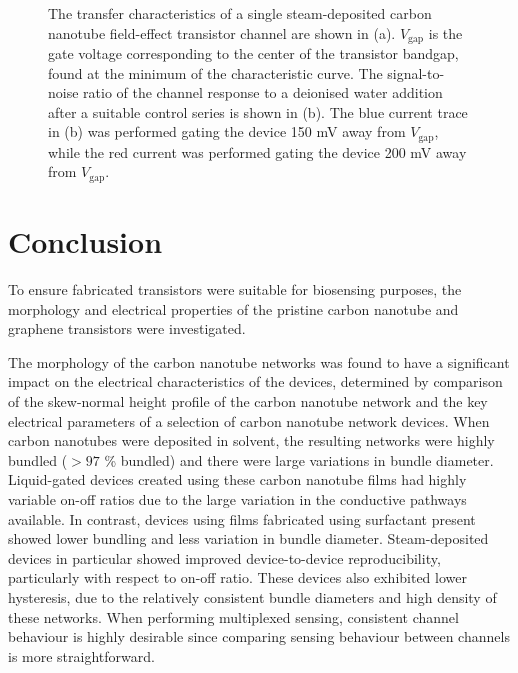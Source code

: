 \documentclass[
  a4paper,
]{scrbook}
\begin{document}
\begin{figure}
\begin{minipage}[t]{0.55\linewidth}
{}

\end{minipage}%

\caption[Figure demonstrating change in signal-to-noise ratio resulting
from adjusting gate voltage.]{\label{fig-salt-conc-SNR}The transfer
characteristics of a single steam-deposited carbon nanotube field-effect
transistor channel are shown in (a). \(V_{\textrm{gap}}\) is the gate
voltage corresponding to the center of the transistor bandgap, found at
the minimum of the characteristic curve. The signal-to-noise ratio of
the channel response to a deionised water addition after a suitable
control series is shown in (b). The blue current trace in (b) was
performed gating the device 150 mV away from \(V_{\textrm{gap}}\), while
the red current was performed gating the device 200 mV away from
\(V_{\textrm{gap}}\).}

\end{figure}

\hypertarget{conclusion}{%
\section{Conclusion}\label{conclusion}}

To ensure fabricated transistors were suitable for biosensing purposes,
the morphology and electrical properties of the pristine carbon nanotube
and graphene transistors were investigated.

The morphology of the carbon nanotube networks was found to have a
significant impact on the electrical characteristics of the devices,
determined by comparison of the skew-normal height profile of the carbon
nanotube network and the key electrical parameters of a selection of
carbon nanotube network devices. When carbon nanotubes were deposited in
solvent, the resulting networks were highly bundled (\(>97\) \% bundled)
and there were large variations in bundle diameter. Liquid-gated devices
created using these carbon nanotube films had highly variable on-off
ratios due to the large variation in the conductive pathways available.
In contrast, devices using films fabricated using surfactant present
showed lower bundling and less variation in bundle diameter.
Steam-deposited devices in particular showed improved device-to-device
reproducibility, particularly with respect to on-off ratio. These
devices also exhibited lower hysteresis, due to the relatively
consistent bundle diameters and high density of these networks. When
performing multiplexed sensing, consistent channel behaviour is highly
desirable since comparing sensing behaviour between channels is more
straightforward.
\end{document}
